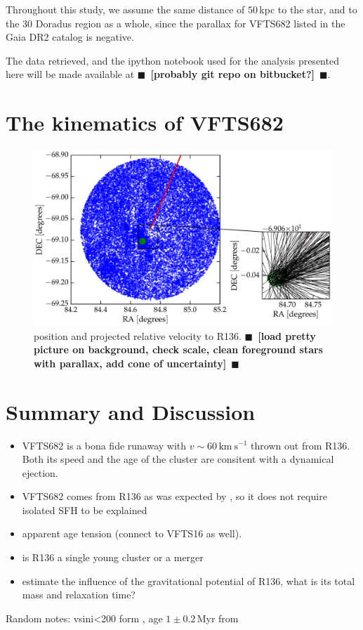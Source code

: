 \documentclass{aa}
\newcommand{\todo}[1]{{\large $\blacksquare$~\textbf{\color{red}[#1]}}~$\blacksquare$}
\begin{document}
Throughout this study, we assume the same distance of $50$\,kpc to the star, and to
the 30 Doradus region as a whole, since the parallax for VFTS682
listed in the Gaia DR2 catalog is negative.

The data retrieved, and the ipython notebook used for the analysis
presented here will be made available at \todo{probably git repo on bitbucket?}. 
\section{The kinematics of VFTS682}
\label{sec:results}

\begin{figure}[htbp]
  \centering
  \includegraphics[width=\textwidth]{./figures/main_plot}  
  \caption{position and projected relative velocity to
    R136. \todo{load pretty picture on background, check scale, clean
      foreground stars with parallax, add cone of uncertainty}}
  \label{fig:main}
\end{figure}



\section{Summary and Discussion}
\label{sec:discussion}

\begin{itemize}
\item VFTS682 is a bona fide runaway with $v\sim60\,\mathrm{km\
    s^{-1}}$ thrown out from R136. Both its speed and the age of the
  cluster are consitent with a dynamical ejection.
  \item VFTS682 comes from R136 as was expected by
  \cite{bestenlehner:11, fujii:11, banerjee:12}, so it does not
  require isolated SFH to be explained
\item apparent age tension (connect to VFTS16 as well).
\item is R136 a single young cluster or a merger
\item estimate the influence of the gravitational potential of R136,
  what is its total mass and relaxation time?
\end{itemize}

Random notes: vsini<200 form \cite{schneider:18}, age $1\pm 0.2$\,Myr
from \cite{schneider:18}



\end{document}
